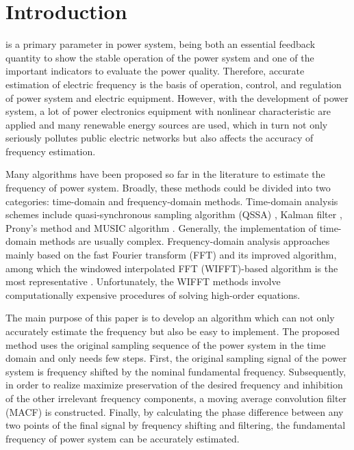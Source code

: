 \documentclass[journal,twoside]{IEEEtran}
\begin{document}
\section{Introduction}
% 
% 
% 
% 

 is a primary parameter in power system, being both an essential feedback quantity to show the stable operation of the power system and one of the important indicators to evaluate the power quality. Therefore, accurate estimation of electric frequency is the basis of operation, control, and regulation of power system and electric equipment. However, with the development of power system, a lot of power electronics equipment with nonlinear characteristic are applied and many renewable energy sources are used, which in turn not only seriously pollutes public electric networks but also affects the accuracy of frequency estimation.

Many algorithms have been proposed so far in the literature to estimate the frequency of power system. Broadly, these methods could be divided into two categories: time-domain and frequency-domain methods. Time-domain analysis schemes include quasi-synchronous sampling algorithm (QSSA) \cite{Zhou2011}, Kalman filter \cite{Bagheri2016}, Prony's method \cite{Zygarlicki2010} and MUSIC algorithm \cite{Lobos2006}. Generally, the implementation of time-domain methods are usually complex. Frequency-domain analysis approaches mainly based on the fast Fourier transform (FFT) and its improved algorithm, among which the windowed interpolated FFT (WIFFT)-based algorithm is the most representative \cite{Harris1978,Wen2011,Wen2014}. Unfortunately, the WIFFT methods involve computationally expensive procedures of solving high-order equations.

The main purpose of this paper is to develop an algorithm which can not only accurately estimate the frequency but also be easy to implement. The proposed method uses the original sampling sequence of the power system in the time domain and only needs few steps. First, the original sampling signal of the power system is frequency shifted by the nominal fundamental frequency. Subsequently, in order to realize maximize preservation of the desired frequency and inhibition of the other irrelevant frequency components, a moving average convolution filter (MACF) is constructed. Finally, by calculating the phase difference between any two points of the final signal by frequency shifting and filtering, the fundamental frequency of power system can be accurately estimated.
\end{document}
